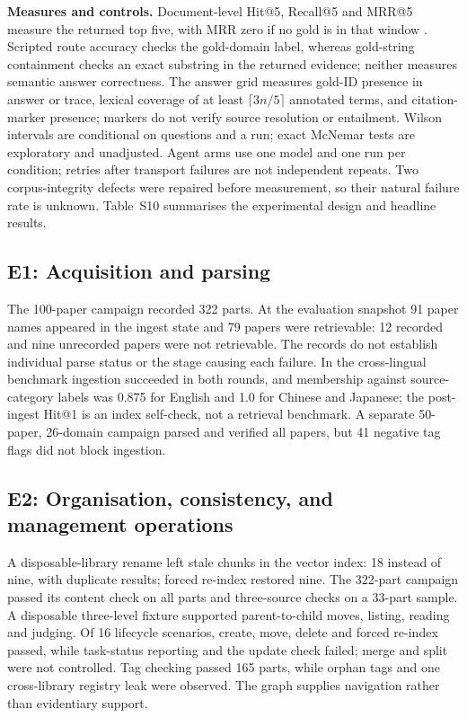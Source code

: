 \textbf{Measures and controls.} Document-level Hit@5, Recall@5 and MRR@5
measure the returned top five, with MRR zero if no gold is in that window
\cite{craswell-msmarco-2021}. Scripted route accuracy checks the gold-domain
label, whereas gold-string containment checks an exact substring in the
returned evidence; neither measures semantic answer correctness. The answer
grid measures gold-ID presence in answer or trace, lexical coverage of at
least $\lceil3n/5\rceil$ annotated terms, and citation-marker presence;
markers do not verify source resolution or entailment. Wilson intervals are
conditional on questions and a run; exact McNemar tests are exploratory and
unadjusted. Agent arms use one model and one run per condition; retries after
transport failures are not independent repeats. Two corpus-integrity defects
were repaired before measurement, so their natural failure rate is unknown.
Table~S10 summarises the experimental design and headline results.

\subsection{E1: Acquisition and parsing}
\label{sec:e1}
The 100-paper campaign recorded 322 parts. At the evaluation snapshot 91
paper names appeared in the ingest state and 79 papers were retrievable:
12 recorded and nine unrecorded papers were not retrievable. The records do
not establish individual parse status or the stage causing each failure. In
the cross-lingual benchmark ingestion succeeded in both rounds, and
membership against source-category labels was 0.875 for English and 1.0 for
Chinese and Japanese; the post-ingest Hit@1 is an index self-check, not a
retrieval benchmark. A separate 50-paper, 26-domain campaign parsed and
verified all papers, but 41 negative tag flags did not block ingestion.

\subsection{E2: Organisation, consistency, and management operations}
\label{sec:e2}
A disposable-library rename left stale chunks in the vector index: 18 instead
of nine, with duplicate results; forced re-index restored nine. The 322-part
campaign passed its content check on all parts and three-source checks on a
33-part sample. A disposable three-level fixture supported parent-to-child
moves, listing, reading and judging. Of 16 lifecycle scenarios, create, move,
delete and forced re-index passed, while task-status reporting and the update
check failed; merge and split were not controlled. Tag checking passed 165
parts, while orphan tags and one cross-library registry leak were observed.
The graph supplies navigation rather than evidentiary support.

